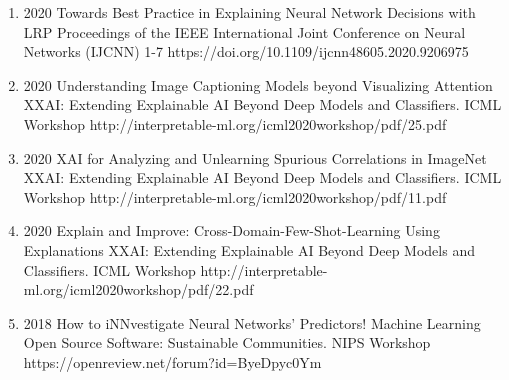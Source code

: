 {\begin{enumerate}
        \item {}
                                {2020}
                                {Towards Best Practice in Explaining Neural Network Decisions with LRP}
                                {Proceedings of the IEEE International Joint Conference on Neural Networks (IJCNN)}
                                {1-7}
                                {https://doi.org/10.1109/ijcnn48605.2020.9206975}

        \item {}
                                {2020}
                                {Understanding Image Captioning Models beyond Visualizing Attention}
                                {XXAI: Extending Explainable AI Beyond Deep Models and Classifiers. ICML Workshop}
                                {}
                                {http://interpretable-ml.org/icml2020workshop/pdf/25.pdf}


        \item {}
                                {2020}
                                {XAI for Analyzing and Unlearning Spurious Correlations in ImageNet}
                                {XXAI: Extending Explainable AI Beyond Deep Models and Classifiers. ICML Workshop}
                                {}
                                {http://interpretable-ml.org/icml2020workshop/pdf/11.pdf}


        \item {}
                                {2020}
                                {Explain and Improve: Cross-Domain-Few-Shot-Learning Using Explanations}
                                {XXAI: Extending Explainable AI Beyond Deep Models and Classifiers. ICML Workshop}
                                {}
                                {http://interpretable-ml.org/icml2020workshop/pdf/22.pdf}


        \item {}
                                {2018}
                                {How to iNNvestigate Neural Networks' Predictors!}
                                {Machine Learning Open Source Software: Sustainable Communities. NIPS Workshop}
                                {}
                                {https://openreview.net/forum?id=ByeDpyc0Ym}



\end{enumerate}}

